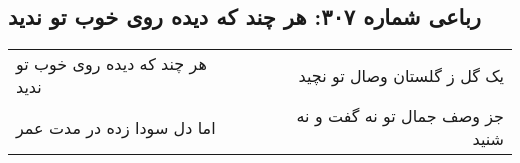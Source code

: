 \begin{center}
\section*{رباعی شماره ۳۰۷: هر چند که دیده روی خوب تو ندید}
\label{sec:sh307}
\begin{longtable}{l p{0.5cm} r}
هر چند که دیده روی خوب تو ندید
&&
یک گل ز گلستان وصال تو نچید
\\
اما دل سودا زده در مدت عمر
&&
جز وصف جمال تو نه گفت و نه شنید
\\
\end{longtable}
\end{center}
